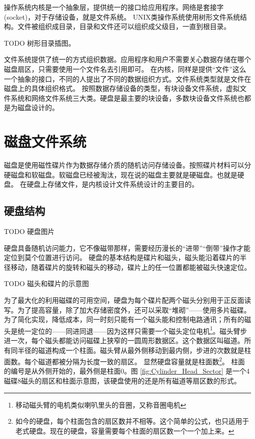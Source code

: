 
操作系统内核是一个抽象层，提供统一的接口给应用程序。网络是套接字(socket)，对于存储设备，就是文件系统。
UNIX类操作系统使用树形文件系统结构。文件被组织成目录，目录和文件还可以组织成父级目，一直到根目录。

TODO 树形目录插图。 %

文件系统提供了统一的方式组织数据。应用程序和用户不需要关心数据存储在哪个磁盘扇区，只需要使用一个文件名去引用即可。
在内核，同样是提供“文件”这么一个抽象的接口，不同的人提出了不同的数据组织方式。文件系统类型就是文件在磁盘上的具体组织格式。
按照数据存储设备的类型，有块设备文件系统，虚拟文件系统和网络文件系统三大类。硬盘是最主要的块设备，多数块设备文件系统也都是为磁盘设计的。

\section{磁盘文件系统}

磁盘是使用磁性碟片作为数据存储介质的随机访问存储设备。按照碟片材料可以分硬磁盘和软磁盘。软磁盘已经被淘汰，现在说的磁盘主要就是硬磁盘。也就是硬盘。
在硬盘上存储文件，是内核设计文件系统设计的主要目的。

\subsection{硬盘结构}

TODO 硬盘图片 %

硬盘具备随机访问能力，它不像磁带那样，需要经历漫长的“进带”“倒带”操作才能定位到莫个位置进行访问。
硬盘的基本结构是碟片和磁头，磁头能沿着碟片的半径移动，随着碟片的旋转和磁头的移动，碟片上的任一位置都能被磁头快速定位。

TODO 磁头和碟片的示意图 %

为了最大化的利用磁碟的可用空间，硬盘为每个碟片配两个磁头分别用于正反面读写。为了提高容量，除了加大存储密度外，还可以采取“堆砌”——使用多片磁碟。为了简化实现，降低成本，同一时刻只能有一个磁头能和控制电路通讯；所有的磁头是统一定位的——同进同退——因为这样只需要一个磁头定位电机\footnote{移动磁头臂的电机类似喇叭里头的音圈，又称音圈电机}。磁头臂步进一次，每个磁头都能访问磁碟上狭窄的一圆周形数据区。这个数据区叫磁道。所有同半径的磁道构成一个柱面。磁头臂从最外侧移动到最内侧，步进的次数就是柱面数。每个磁道都被分隔为长度一致的扇区。
显然硬盘容量就是柱面数 \footnote{如今的硬盘，每个柱面包含的扇区数并不相等。这个简单的公式，也只适用于老式硬盘。现在的硬盘，容量需要每个柱面的扇区数一个一个加上来。}。
柱面的编号是从外侧开始的，最外侧是柱面0。图 \ref{fig:Cylinder_Head_Sector} 是一个4磁碟8磁头的扇区和柱面示意图，该硬盘使用的还是所有磁道等扇区数的形式。

